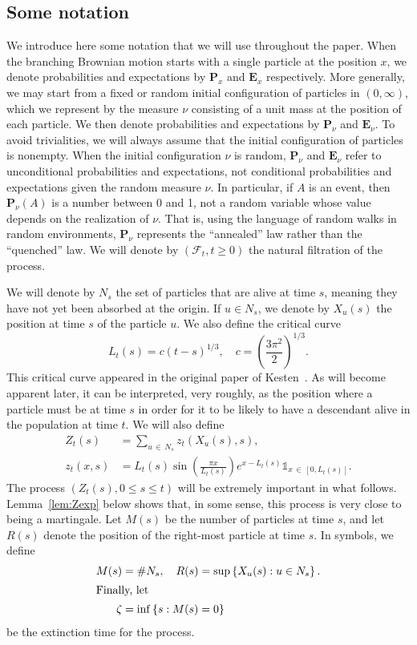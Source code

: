 \documentclass[10pt]{amsart}
\theoremstyle{definition}\newtheorem{defi}[theo]{Definition}\newtheorem{rema}[theo]{Remark}\newtheorem{exam}[theo]{Example}\newtheorem{exem}[theo]{Example}\newtheorem{nota}[theo]{Notation}
\newcommand*\E{\mathbf{E}}
\renewcommand*\P{\mathbf{P}}
\newcommand\F{\mathcal{F}}
\newcommand{\1} {\mathds{1}}
\begin{document}
\subsection{Some notation}

We introduce here some notation that we will use throughout the paper. When the branching Brownian motion starts with a single particle at the position $x$, we denote probabilities and expectations by $\P_x$ and $\E_x$ respectively. More generally, we may start from a fixed or random initial configuration of particles in $(0, \infty)$, which we represent by the measure $\nu$ consisting of a unit mass at the position of each particle. We then denote probabilities and expectations by $\P_{\nu}$ and $\E_{\nu}$. To avoid trivialities, we will always assume that the initial configuration of particles is nonempty. When the initial configuration $\nu$ is random, $\P_{\nu}$ and $\E_{\nu}$ refer to unconditional probabilities and expectations, not conditional probabilities and expectations given the random measure $\nu$. In particular, if $A$ is an event, then $\P_{\nu}(A)$ is a number between 0 and 1, not a random variable whose value depends on the realization of $\nu$. That is, using the language of random walks in random environments, $\P_{\nu}$ represents the ``annealed'' law rather than the ``quenched'' law. We will denote by $(\F_t, t \geq 0)$ the natural filtration of the process.

We will denote by $N_s$ the set of particles that are alive at time $s$, meaning they have not yet been absorbed at the origin. If $u \in N_s$, we denote by $X_u(s)$ the position at time $s$ of the particle $u$. We also define the critical curve
\begin{equation}\label{Lcdef}
L_t(s) = c(t - s)^{1/3}, \quad c = \left(\frac{3 \pi^2}{2} \right)^{1/3}.
\end{equation}
This critical curve appeared in the original paper of Kesten~\cite{kesten}. As will become apparent later, it can be interpreted, very roughly, as the position where a particle must be at time $s$ in order for it to be likely to have a descendant alive in the population at time $t$. We will also define
\begin{equation}\label{Zdef}
\begin{split}
Z_t(s) &= \sum_{u\,\in\,N_s} z_t\left(X_u(s), s\right), \\
z_t(x,s) &= L_t(s) \sin \left(\frac{\pi x}{L_t(s)} \right) e^{x - L_t(s)} \1_{x \,\in\,\left[0, L_t(s)\right]}.
\end{split}
\end{equation}
The process $(Z_t(s), 0 \leq s \leq t)$ will be extremely important in what follows. Lem\-ma~\ref{lem:Zexp} below shows that, in some sense, this process is very close to being a martingale. Let $M(s)$ be the number of particles at time $s$, and let $R(s)$ denote the position of the right-most particle at time $s$. In symbols, we define
\begin{align}
M(s) &= \#N_s, \quad R(s) = \sup\left\{X_u(s): u \in N_s\right\}.\label{MRdef}
\\
\intertext{Finally, let}
\zeta &= \inf\left\{s: M(s) = 0\right\}\nonumber
\end{align}
be the extinction time for the process.
\end{document}
